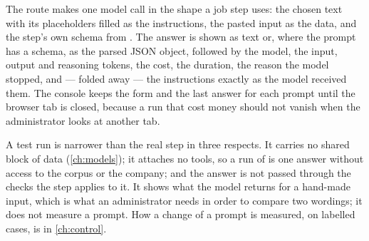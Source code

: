 The route makes one model call in the shape a job step uses: the chosen text with its
placeholders filled as the instructions, the pasted input as the data, and the step's own
schema from . The answer is shown as text or, where the prompt has a schema,
as the parsed JSON object, followed by the model, the input, output and reasoning tokens, the
cost, the duration, the reason the model stopped, and — folded away — the instructions exactly
as the model received them. The console keeps the form and the last answer for each prompt
until the browser tab is closed, because a run that cost money should not vanish when the
administrator looks at another tab.

A test run is narrower than the real step in three respects. It carries no shared block of
data (\cref{ch:models}); it attaches no tools, so a run of  is one
answer without access to the corpus or the company; and the answer is not passed through the
checks the step applies to it. It shows what the model returns for a hand-made input, which is
what an administrator needs in order to compare two wordings; it does not measure a prompt.
How a change of a prompt is measured, on labelled cases, is in \cref{ch:control}.

